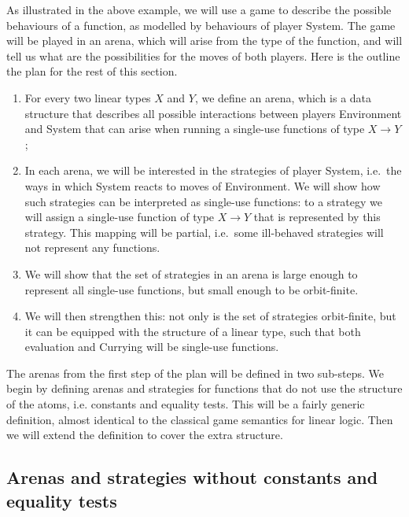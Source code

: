 As illustrated in the above example, we will use a game to describe the possible behaviours of a function, as modelled by behaviours of player System. The game will be played in an arena, which will arise from the type of the function, and will tell us what are the possibilities for the moves of both players.  Here is the  outline the plan for the rest of this section. 
\begin{enumerate}
    \item For every two linear types $X$ and $Y$, we  define an arena, which is a data structure that describes all possible interactions between players Environment and System that can arise when running a  single-use  functions of type $X \to Y$;
    \item In each arena, we will be interested in the strategies of player System, i.e.~the ways in which System reacts to moves of Environment. We will show how such strategies can be interpreted as single-use functions: to a strategy we will assign a single-use function of type $X \to Y$ that is represented by this strategy. This mapping will be partial, i.e.~some ill-behaved strategies will not represent any functions. 
    \item We will show that the  set of strategies in an arena is  large enough to represent all single-use functions, but small enough to be orbit-finite. 
    \item We will then strengthen this: not only is the set of strategies orbit-finite, but it can be equipped with the structure of a linear type, such that both evaluation and Currying will be single-use functions.
\end{enumerate}

The arenas from the first step of the plan will  be defined in two sub-steps. We begin by defining arenas and strategies for functions that do not use the structure of the atoms, i.e. constants and equality tests. This will be a fairly generic definition, almost identical to the classical game semantics for linear logic. Then we will extend the definition to cover the extra structure. 

\subsection{Arenas and strategies without constants and equality tests}
\label{sec:arenas-without-constants-and-equality-tests}

